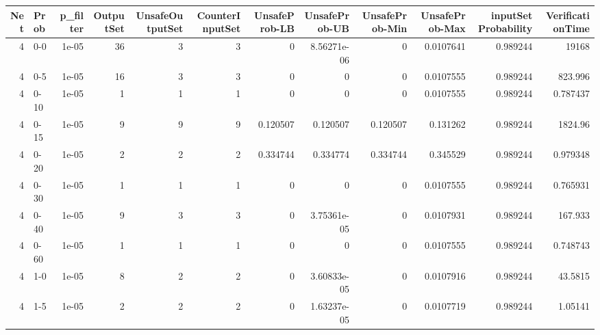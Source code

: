\begin{tabular}{rlrrrrrrrrrr}
\hline
   Net & Prob   &   p\_filter &   OutputSet &   UnsafeOutputSet &   CounterInputSet &   UnsafeProb-LB &   UnsafeProb-UB &   UnsafeProb-Min &   UnsafeProb-Max &   inputSet Probability &   VerificationTime \\
\hline
     4 & 0-0    &      1e-05 &          36 &                 3 &                 3 &     0           &     8.56271e-06 &      0           &        0.0107641 &               0.989244 &       19168        \\
     4 & 0-5    &      1e-05 &          16 &                 3 &                 3 &     0           &     0           &      0           &        0.0107555 &               0.989244 &         823.996    \\
     4 & 0-10   &      1e-05 &           1 &                 1 &                 1 &     0           &     0           &      0           &        0.0107555 &               0.989244 &           0.787437 \\
     4 & 0-15   &      1e-05 &           9 &                 9 &                 9 &     0.120507    &     0.120507    &      0.120507    &        0.131262  &               0.989244 &        1824.96     \\
     4 & 0-20   &      1e-05 &           2 &                 2 &                 2 &     0.334744    &     0.334774    &      0.334744    &        0.345529  &               0.989244 &           0.979348 \\
     4 & 0-30   &      1e-05 &           1 &                 1 &                 1 &     0           &     0           &      0           &        0.0107555 &               0.989244 &           0.765931 \\
     4 & 0-40   &      1e-05 &           9 &                 3 &                 3 &     0           &     3.75361e-05 &      0           &        0.0107931 &               0.989244 &         167.933    \\
     4 & 0-60   &      1e-05 &           1 &                 1 &                 1 &     0           &     0           &      0           &        0.0107555 &               0.989244 &           0.748743 \\
     4 & 1-0    &      1e-05 &           8 &                 2 &                 2 &     0           &     3.60833e-05 &      0           &        0.0107916 &               0.989244 &          43.5815   \\
     4 & 1-5    &      1e-05 &           2 &                 2 &                 2 &     0           &     1.63237e-05 &      0           &        0.0107719 &               0.989244 &           1.05141  \\

\end{tabular}
